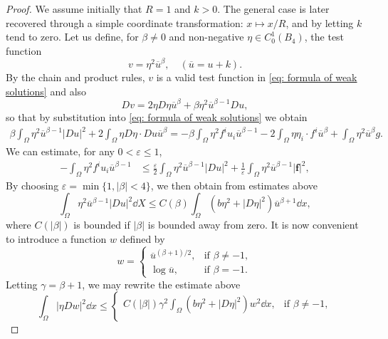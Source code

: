 \begin{proof}
	We assume initially that $R=1$ and $k>0$. The general case is later recovered through a simple coordinate transformation: $x\mapsto x/R$, and by letting $k$ tend to zero.
	Let us define, for $\beta\neq0$ and non-negative $\eta\in C^1_0(B_4)$, the test function
	\[
		v = \eta^2\overline{u}^\beta, \quad(\overline{u} = u + k).
	\]
	By the chain and product rules, $v$ is a valid test function in \eqref{eq: formula of weak solutions} 
	and also
	\[
		Dv = 2\eta D\eta \overline{u}^\beta + \beta\eta^2\overline{u}^{\beta-1}Du,
	\]
	so that by substitution into \eqref{eq: formula of weak solutions} we obtain
	\begin{align*}
		\beta\int_\Omega \eta^2 \overline{u}^{\beta-1}|Du|^2
			+ 2\int_\Omega \eta D\eta\cdot Du \overline{u}^\beta 
			= - \beta\int_\Omega \eta^2f^iu_i\overline{u}^{\beta-1}
			- 2\int_\Omega \eta \eta_i\cdot f^i \overline{u}^\beta
			+ \int_\Omega \eta^2\overline{u}^\beta g. 
	\end{align*}
	We can estimate, for any $0<\varepsilon\leq1$,
	\begin{align*}
		- \int_\Omega \eta^2f^iu_i\overline{u}^{\beta-1}
		&\leq \frac{\varepsilon}{2}\int_\Omega \eta^2 \overline{u}^{\beta-1}|Du|^2 
			+ \frac1\varepsilon\int_\Omega \eta^2 \overline{u}^{\beta-1}|\mathbf{f}|^2,
	\end{align*}
	By choosing $\varepsilon = \min\{1,|\beta|<4\}$, we then obtain from estimates above
	\begin{equation*}
		\int_\Omega \eta^2\overline{u}^{\beta-1}|Du|^2\dd X
		\leq C(\beta)\int_\Omega (b\eta^2 + |D\eta|^2)\overline{u}^{\beta +1}\dd x,
	\end{equation*}
	where $C(|\beta|)$ is bounded if $|\beta|$ is bounded away from zero.
	It is now convenient to introduce a function $w$ defined by
	\begin{equation*}
		w = 
		\begin{cases}
			\overline{u}^{(\beta+1)/2}, & \text{if } \beta\not=-1,\\
			\log\overline{u}, & \text{if }\beta = -1.
		\end{cases}
	\end{equation*}
	Letting $\gamma = \beta + 1$, we may rewrite the estimate above
	\begin{equation}
		\label{eq: local gradient estimates}
		\int_\Omega |\eta Dw|^2 \dd x \leq
		\begin{cases}
			C(|\beta|)\gamma^2\int_\Omega (b\eta^2 + |D\eta|^2)w^2\dd x, & \text{if }\beta\neq-1,\\

\end{cases}
\end{equation}
\end{proof}
